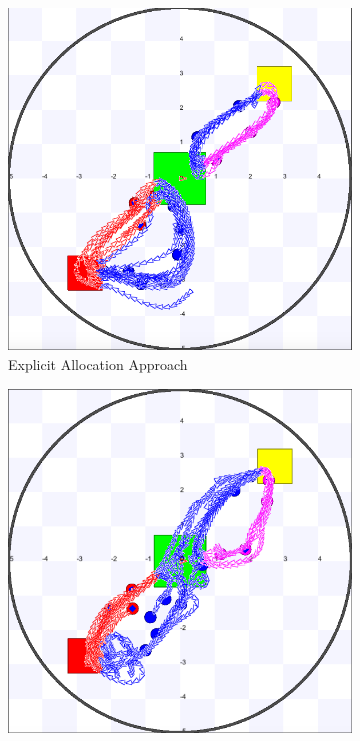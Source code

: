 \documentclass[letterpaper, 10 pt, conference]{ieeeconf}  %
\begin{document}
\begin{figure}[H]
  \begin{subfigure}{.25\textwidth}
      \includegraphics[width=0.9\linewidth]{images/explicit/2/raw/16.png}
         \centering
         \caption{Explicit Allocation Approach}
   \end{subfigure}%
     \begin{subfigure}{.25\textwidth}
       \includegraphics[width=0.9\linewidth]{images/embodied/2/raw/16.png}

\end{subfigure}
\end{figure}
\end{document}
